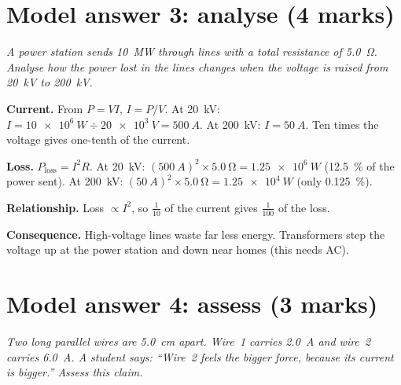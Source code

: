 \begin{markingcriteria}
\end{markingcriteria}

\section*{Model answer 3: analyse (4 marks)}

\emph{A power station sends \qty{10}{MW} through lines with a total resistance of
\qty{5.0}{\ohm}. Analyse how the power lost in the lines changes when the voltage is
raised from \qty{20}{kV} to \qty{200}{kV}.}

\begin{modelanswer}
 \textbf{Current.} From $P = VI$, $I = P/V$. At \qty{20}{kV}:
$I = \qty{10e6}{W} \div \qty{20e3}{V} = \qty{500}{A}$. At \qty{200}{kV}: $I = \qty{50}{A}$.
Ten times the voltage gives one-tenth of the current.

 \textbf{Loss.} $P_\mathrm{loss} = I^2R$. At \qty{20}{kV}:
$(\qty{500}{A})^2 \times \qty{5.0}{\ohm} = \qty{1.25e6}{W}$ (\qty{12.5}{\percent} of the
power sent). At \qty{200}{kV}: $(\qty{50}{A})^2 \times \qty{5.0}{\ohm} = \qty{1.25e4}{W}$
(only \qty{0.125}{\percent}).

 \textbf{Relationship.} Loss $\propto I^2$, so $\frac{1}{10}$ of the current gives
$\frac{1}{100}$ of the loss.

 \textbf{Consequence.} High-voltage lines waste far less energy. Transformers step
the voltage up at the power station and down near homes (this needs AC).
\end{modelanswer}

\begin{markingcriteria}
\end{markingcriteria}

\section*{Model answer 4: assess (3 marks)}

\emph{Two long parallel wires are \qty{5.0}{cm} apart. Wire~1 carries \qty{2.0}{A} and
wire~2 carries \qty{6.0}{A}. A student says: ``Wire~2 feels the bigger force, because its
current is bigger.'' Assess this claim.}

